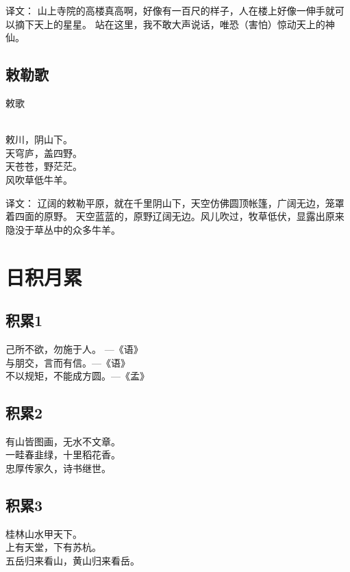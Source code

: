 译文：
山上寺院的高楼真高啊，好像有一百尺的样子，人在楼上好像一伸手就可以摘下天上的星星。
站在这里，我不敢大声说话，唯恐（害怕）惊动天上的神仙。

\subsection{敕勒歌}
\begin{pinyinscope}
\noindent  \huge 敕歌

 \\

\noindent 敕川，阴山下。\\天穹庐，盖四野。\\
天苍苍，野茫茫。\\风吹草低牛羊。
\end{pinyinscope}

译文：
辽阔的敕勒平原，就在千里阴山下，天空仿佛圆顶帐篷，广阔无边，笼罩着四面的原野。
天空蓝蓝的，原野辽阔无边。风儿吹过，牧草低伏，显露出原来隐没于草丛中的众多牛羊。

\section{日积月累}
\subsection{积累1}
\begin{pinyinscope}
	\huge
	\noindent 己所不欲，勿施于人。 ---{\kaishu \large 《语》}\\
	与朋交，言而有信。---{\kaishu \large 《语》}\\
	不以规矩，不能成方圆。---{\kaishu \large 《孟》}
\end{pinyinscope}

\subsection{积累2}
\begin{pinyinscope}
	\huge
	\noindent 有山皆图画，无水不文章。\\
	一畦春韭绿，十里稻花香。\\
	忠厚传家久，诗书继世。
\end{pinyinscope}

\subsection{积累3}
\begin{pinyinscope}
	\huge
	\noindent 桂林山水甲天下。\\
	上有天堂，下有苏杭。\\
	五岳归来看山，黄山归来看岳。
\end{pinyinscope}

